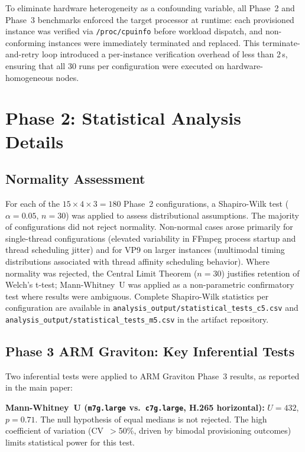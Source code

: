 \documentclass[conference]{IEEEtran}
\begin{document}
To eliminate hardware heterogeneity as a confounding variable, all Phase~2 and
Phase~3 benchmarks enforced the target processor at runtime: each provisioned
instance was verified via \texttt{/proc/cpuinfo} before workload dispatch, and
non-conforming instances were immediately terminated and replaced. This terminate-and-retry loop introduced a per-instance verification overhead
of less than 2\,s, ensuring that all 30 runs per configuration were executed
on hardware-homogeneous nodes.

\section{Phase 2: Statistical Analysis Details}
\label{app:stats}

\subsection{Normality Assessment}

For each of the $15 \times 4 \times 3 = 180$ Phase~2 configurations, a
Shapiro-Wilk test ($\alpha = 0.05$, $n = 30$) was applied to assess distributional
assumptions. The majority of configurations did not reject normality.
Non-normal cases arose primarily for single-thread configurations (elevated
variability in FFmpeg process startup and thread scheduling jitter) and for VP9
on larger instances (multimodal timing distributions associated with thread
affinity scheduling behavior). Where normality was rejected, the Central Limit
Theorem ($n = 30$) justifies retention of Welch's t-test; Mann-Whitney~U was
applied as a non-parametric confirmatory test where results were ambiguous.
Complete Shapiro-Wilk statistics per configuration are available in
\texttt{analysis\_output/statistical\_tests\_c5.csv} and
\texttt{analysis\_output/statistical\_tests\_m5.csv} in the artifact repository.

\subsection{Phase 3 ARM Graviton: Key Inferential Tests}

Two inferential tests were applied to ARM Graviton Phase~3 results, as
reported in the main paper:

\textbf{Mann-Whitney~U (\texttt{m7g.large} vs.\ \texttt{c7g.large}, H.265
horizontal):} $U = 432$, $p = 0.71$. The null hypothesis of equal medians is
not rejected. The high coefficient of variation (CV~$>$50\%, driven by bimodal
provisioning outcomes) limits statistical power for this test.
\end{document}
